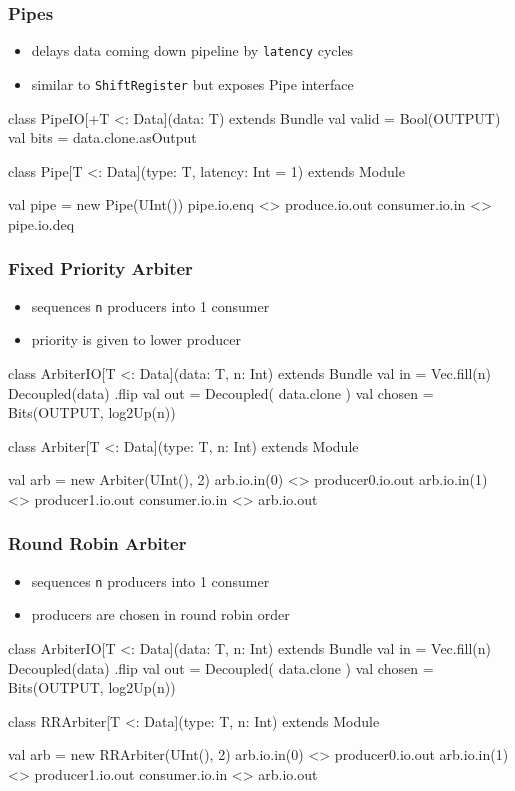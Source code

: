\documentclass[xcolor=pdflatex,dvipsnames,table]{beamer}
\begin{document}
\begin{frame}[fragile]
\frametitle{Pipes}
\begin{itemize}
\item delays data coming down pipeline by \verb+latency+ cycles
\item similar to \verb+ShiftRegister+ but exposes Pipe interface
\end{itemize}
\begin{scala}
class PipeIO[+T <: Data](data: T) extends Bundle {
  val valid = Bool(OUTPUT)
  val bits  = data.clone.asOutput
}

class Pipe[T <: Data](type: T, latency: Int = 1) extends Module
\end{scala}
\begin{scala}
val pipe = new Pipe(UInt())
pipe.io.enq <> produce.io.out
consumer.io.in <> pipe.io.deq
\end{scala}
\end{frame}

\begin{frame}[fragile]
\frametitle{Fixed Priority Arbiter}
\begin{itemize}
\item sequences \verb+n+ producers into 1 consumer
\item priority is given to lower producer
\end{itemize}
\begin{scala}
class ArbiterIO[T <: Data](data: T, n: Int) extends Bundle {
  val in     = Vec.fill(n) { Decoupled(data) }.flip
  val out    = Decoupled( data.clone )
  val chosen = Bits(OUTPUT, log2Up(n))
}

class Arbiter[T <: Data](type: T, n: Int) extends Module 
\end{scala}
\begin{scala}
val arb = new Arbiter(UInt(), 2)
arb.io.in(0) <> producer0.io.out
arb.io.in(1) <> producer1.io.out
consumer.io.in <> arb.io.out
\end{scala}
\end{frame}

\begin{frame}[fragile]
\frametitle{Round Robin Arbiter}
\begin{itemize}
\item sequences \verb+n+ producers into 1 consumer
\item producers are chosen in round robin order
\end{itemize}
\begin{scala}
class ArbiterIO[T <: Data](data: T, n: Int) extends Bundle {
  val in     = Vec.fill(n) { Decoupled(data) }.flip
  val out    = Decoupled( data.clone )
  val chosen = Bits(OUTPUT, log2Up(n))
}

class RRArbiter[T <: Data](type: T, n: Int) extends Module 
\end{scala}
\begin{scala}
val arb = new RRArbiter(UInt(), 2)
arb.io.in(0) <> producer0.io.out
arb.io.in(1) <> producer1.io.out
consumer.io.in <> arb.io.out
\end{scala}
\end{frame}
\end{document}
